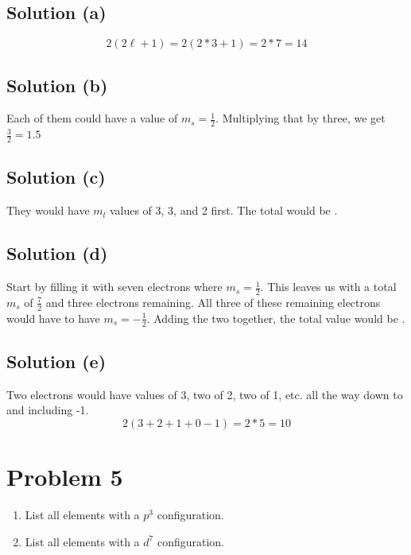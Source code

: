 \documentclass[12pt]{report}
\begin{document}
\subsection{Solution (a)}
    \begin{equation}
        2(2\ell + 1) = 2(2*3 + 1) = 2*7 = \boxed{14}
    \end{equation}

\subsection{Solution (b)}
    Each of them could have a value of $m_s = \frac{1}{2}$. 
    Multiplying that by three, we get \underline{$\frac{3}{2} = 1.5$}

\subsection{Solution (c)}
    They would have $m_l$ values of 3, 3, and 2 first.
    The total would be .

\subsection{Solution (d)}
    Start by filling it with seven electrons where $m_s = \frac{1}{2}$.
    This leaves us with a total $m_s$ of $\frac{7}{2}$ and three electrons remaining.
    All three of these remaining electrons would have to have $m_s = -\frac{1}{2}$.
    Adding the two together, the total value would be .

\subsection{Solution (e)}
    Two electrons would have values of 3, two of 2, two of 1, etc. all the way down to and including -1.
    \begin{equation}
        2\left( 3 + 2 + 1 + 0 - 1 \right) = 2 * 5 = \boxed{10}
    \end{equation}
\pagebreak

\section{Problem 5} %
\begin{enumerate}[label=(\alph*)]
    \item   List all elements with a $p^3$ conﬁguration. 
    \item   List all elements with a $d^7$ conﬁguration.
\end{enumerate}
\end{document}
